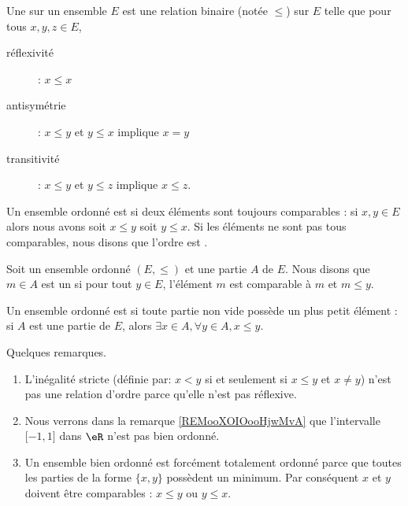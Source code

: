 \begin{definition}      \label{DefooFLYOooRaGYRk}
    Une  sur un ensemble \( E\) est une relation binaire (notée \( \leq\)) sur \( E\) telle que pour tous \( x,y,z\in E\), 
    \begin{description}
        \item[réflexivité]
             : \( x\leq x\)
         \item[antisymétrie] : \( x\leq y\) et \( y\leq x\) implique \( x=y\)
         \item[transitivité] : \( x\leq y\) et \( y\leq z\) implique \( x\leq z\).
    \end{description}
\end{definition}

\begin{definition}      \label{DEFooVGYQooUhUZGr}
    Un ensemble ordonné est  si deux éléments sont toujours comparables : si \( x,y\in E\) alors nous avons soit \( x\leq y\) soit \( y\leq x\). Si les éléments ne sont pas tous comparables, nous disons que l'ordre est .
\end{definition}

\begin{definition}
    Soit un ensemble ordonné \( (E,\leq)\) et une partie \( A\) de \( E\). Nous disons que \( m\in A\) est un  si pour tout \( y\in E\), l'élément \( m\) est comparable à \( m\) et \( m\leq y\).
\end{definition}

\begin{definition}   \label{DEFooLJEAooBLGsiS}
    Un ensemble ordonné est  si toute partie non vide possède un plus petit élément : si \( A\) est une partie de \( E\), alors \( \exists x\in A,\forall y\in A, x\leq y\).
\end{definition}

\begin{normaltext}
    Quelques remarques.
    \begin{enumerate}
        \item 
            L'inégalité stricte (définie par: \( x<y\) si et seulement si \( x\leq y\) et \( x\neq y\)) n'est pas une relation d'ordre parce qu'elle n'est pas réflexive.
        \item
            Nous verrons dans la remarque \ref{REMooXOIOooHjwMvA} que l'intervalle \( \mathopen[ -1 , 1 \mathclose]\) dans \( \eR\) n'est pas bien ordonné.
        \item
            Un ensemble bien ordonné est forcément totalement ordonné parce que toutes les parties de la forme \( \{ x,y \}\) possèdent un minimum. Par conséquent \( x\) et \( y\) doivent être comparables : \( x\leq y\) ou \( y\leq x\).
    \end{enumerate}
\end{normaltext}
            
